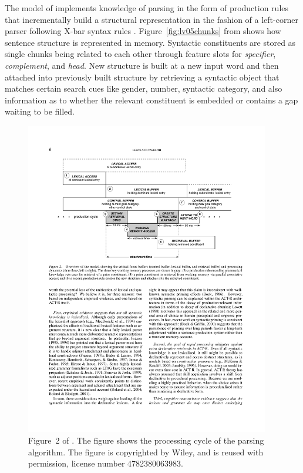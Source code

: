 \documentclass{cambridge7A}\usepackage[]{graphicx}\usepackage[]{color}
\begin{document}
The model of \cite{LewisVasishth2005} implements knowledge of parsing in the form of production rules that incrementally build a structural representation in the fashion of a left-corner parser following X-bar syntax rules \citep{Chomsky1986}. 
Figure~\ref{fig:lv05chunks} from \cite{LewisVasishth2005} shows how sentence structure is represented in memory. Syntactic constituents are stored as single chunks being related to each other through feature slots for \emph{specifier}, \emph{complement}, and \emph{head}.
New structure is built at a new input word and then attached into previously built structure by retrieving a syntactic object that matches certain search cues like gender, number, syntactic category, and also information as to whether the relevant constituent is embedded or contains a gap waiting to be filled. 
%
\begin{figure}[htb]
	\centering
	\includegraphics[width=0.95\textwidth]{figures/lv05-fig2-buffers}
	\caption{Figure~2 of \cite{LewisVasishth2005}. The figure shows the processing cycle of the parsing algorithm. The figure is copyrighted by Wiley, and is reused with permission, license number 4782380063983.}
	\label{fig:lv05buffers}
\end{figure}
\end{document}

